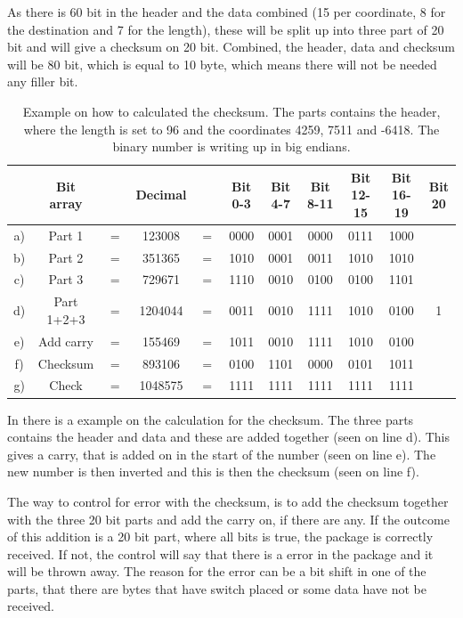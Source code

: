 As there is 60 bit in the header and the data combined (15 per coordinate, 8 for the destination and 7 for the length), these will be split up into three part of 20 bit and will give a checksum on 20 bit. Combined, the header, data and checksum will be 80 bit, which is equal to 10 byte, which means there will not be needed any filler bit.

\begin{table}[H]
\centering
\begin{tabular}{c c c c c c c c c c c}
   & Bit array  &     & Decimal &     & Bit 0-3 & Bit 4-7 & Bit 8-11 & Bit 12-15 & Bit 16-19 & Bit 20 \\
\hline
a) & Part 1     & $=$ & 123008  & $=$ & 0000 & 0001 & 0000 & 0111 & 1000 & \\
b) & Part 2     & $=$ & 351365  & $=$ & 1010 & 0001 & 0011 & 1010 & 1010 & \\
c) & Part 3     & $=$ & 729671  & $=$ & 1110 & 0010 & 0100 & 0100 & 1101 & \\
d) & Part 1+2+3 & $=$ & 1204044 & $=$ & 0011 & 0010 & 1111 & 1010 & 0100 & 1 \\
e) & Add carry  & $=$ & 155469  & $=$ & 1011 & 0010 & 1111 & 1010 & 0100 & \\
f) & Checksum   & $=$ & 893106  & $=$ & 0100 & 1101 & 0000 & 0101 & 1011 & \\
g) & Check      & $=$ & 1048575 & $=$ & 1111 & 1111 & 1111 & 1111 & 1111 & \\
\end{tabular}
\caption{Example on how to calculated the checksum. The parts contains the header, where the length is set to 96 and the coordinates 4259, 7511 and -6418. The binary number is writing up in big endians.}
\label{ChecksumExp}
\end{table}

In  there is a example on the calculation for the checksum. The three parts contains the header and data and these are added together (seen on line d). This gives a carry, that is added on in the start of the number (seen on line e). The new number is then inverted and this is then the checksum (seen on line f).

The way to control for error with the checksum, is to add the checksum together with the three 20 bit parts and add the carry on, if there are any. If the outcome of this addition is a 20 bit part, where all bits is true, the package is correctly received. If not, the control will say that there is a error in the package and it will be thrown away. The reason for the error can be a bit shift in one of the parts, that there are bytes that have switch placed or some data have not be received. 

